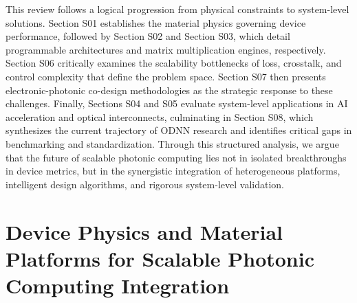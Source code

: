 \documentclass[11pt]{article}
\begin{document}
This review follows a logical progression from physical constraints to system-level solutions. Section S01 establishes the material physics governing device performance, followed by Section S02 and Section S03, which detail programmable architectures and matrix multiplication engines, respectively. Section S06 critically examines the scalability bottlenecks of loss, crosstalk, and control complexity that define the problem space. Section S07 then presents electronic-photonic co-design methodologies as the strategic response to these challenges. Finally, Sections S04 and S05 evaluate system-level applications in AI acceleration and optical interconnects, culminating in Section S08, which synthesizes the current trajectory of ODNN research and identifies critical gaps in benchmarking and standardization. Through this structured analysis, we argue that the future of scalable photonic computing lies not in isolated breakthroughs in device metrics, but in the synergistic integration of heterogeneous platforms, intelligent design algorithms, and rigorous system-level validation.

\section{Device Physics and Material Platforms for Scalable Photonic Computing Integration}\label{device-physics-and-material-platforms-for-scalable-photonic-computing-integration}
\end{document}
